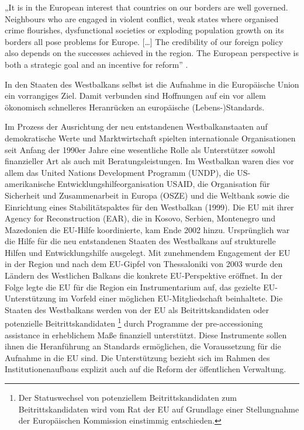 „It is in the European interest that countries on our borders are well governed. Neighbours who are engaged in violent conflict, weak states where organised crime flourishes, dysfunctional societies or exploding population growth on its borders all pose problems for Europe. […] The credibility of our foreign policy also depends on the successes achieved in the region. The European perspective is both a strategic goal and an incentive for reform” \cite{solana}.\par

In den Staaten des Westbalkans selbst ist die Aufnahme in die Europäische Union ein vorrangiges Ziel. Damit verbunden sind Hoffnungen auf ein vor allem ökonomisch schnelleres Heranrücken an europäische (Lebens-)Standards.\par

Im Prozess der Ausrichtung der neu entstandenen Westbalkanstaaten auf demokratische Werte und Marktwirtschaft spielten internationale Organisationen seit Anfang der 1990er Jahre eine wesentliche Rolle als Unterstützer sowohl finanzieller Art als auch mit Beratungsleistungen. Im Westbalkan waren dies vor allem das United Nations Development Programm (UNDP), die US-amerikanische Entwicklungshilfeorganisation USAID, die Organisation für Sicherheit und Zusammenarbeit in Europa (OSZE) und die Weltbank sowie die Einrichtung eines Stabilitätspaktes für den Westbalkan (1999). Die EU mit ihrer Agency for Reconstruction (EAR), die in Kosovo, Serbien, Montenegro und Mazedonien die EU-Hilfe koordinierte, kam Ende 2002 hinzu. Ursprünglich war die Hilfe für die neu entstandenen Staaten des Westbalkans auf strukturelle Hilfen und Entwicklungshilfe ausgelegt. Mit zunehmendem Engagement der EU in der Region und nach dem EU-Gipfel von Thessaloniki von 2003 wurde den Ländern des Westlichen Balkans die konkrete EU-Perspektive eröffnet. In der Folge legte die EU für die Region ein Instrumentarium auf, das gezielte EU-Unterstützung im Vorfeld einer möglichen EU-Mitgliedschaft beinhaltete. Die Staaten des Westbalkans werden von der EU als Beitrittskandidaten oder potenzielle Beitrittskandidaten \footnote{Der Statuswechsel von potenziellem Beitrittskandidaten zum Beitrittskandidaten wird vom Rat der EU auf Grundlage einer Stellungnahme der Europäischen Kommission einstimmig entschieden.} durch Programme der pre-accessioning assistance in erheblichem Maße finanziell unterstützt. Diese Instrumente sollen ihnen die Heranführung an Standards ermöglichen, die Voraussetzung für die Aufnahme in die EU sind. Die Unterstützung bezieht sich im Rahmen des Institutionenaufbaus explizit auch auf die Reform der öffentlichen Verwaltung.
